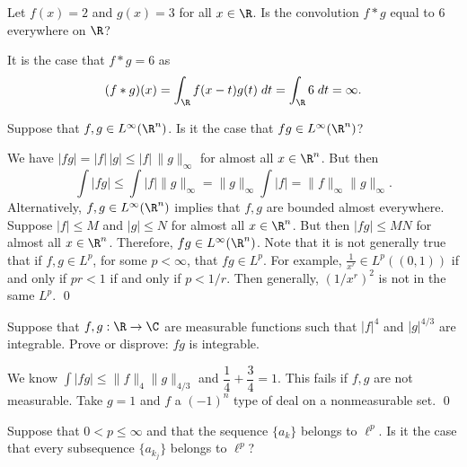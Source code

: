 \begin{quizsol}
Let $f(x)=2$ and $g(x)=3$ for all $x \in \R$. Is the convolution $f*g$ equal to 6 everywhere on $\R$?
\end{quizsol}

\pf It is the case that $f*g=6$ as
	\[
	(f*g)(x)= \int_\R f(x-t)g(t) \; dt= \int_\R 6 \; dt = \infty.
	\]


\begin{quizsol}
Suppose that $f,g \in L^\infty(\R^n)$. Is it the case that $fg \in L^\infty(\R^n)$? 
\end{quizsol}

\pf We have $|fg|=|f|\,|g| \leq |f| \, \|g\|_\infty$ for almost all $x \in \R^n$. But then
	\[
	\int |fg| \leq \int |f| \|g\|_\infty = \|g\|_\infty \int |f|= \|f\|_\infty \|g\|_\infty. 
	\]
Alternatively, $f,g \in L^\infty(\R^n)$ implies that $f,g$ are bounded almost everywhere. Suppose $|f| \leq M$ and $|g| \leq N$ for almost all $x \in \R^n$. But then $|fg| \leq MN$ for almost all $x \in \R^n$. Therefore, $fg \in L^\infty(\R^n)$. Note that it is not generally true that if $f,g \in L^p$, for some $p<\infty$, that $fg \in L^p$. For example, $\frac{1}{x^r} \in L^p((0,1))$ if and only if $pr<1$ if and only if $p<1/r$. Then generally, $(1/x^r)^2$ is not in the same $L^p$. \qed \\


%


\begin{quizsol}
Suppose that $f,g: \R \to \C$ are measurable functions such that $|f|^4$ and $|g|^{4/3}$ are integrable. Prove or disprove: $fg$ is integrable.
\end{quizsol}

\pf We know $\int |fg| \leq \|f\|_4 \|g\|_{4/3}$ and $\dfrac{1}{4} + \dfrac{3}{4} = 1$. This fails if $f,g$ are not measurable. Take $g=1$ and $f$ a $(-1)^n$ type of deal on a nonmeasurable set. \qed \\


\begin{quizsol}
Suppose that $0< p \leq \infty$ and that the sequence $\{a_k\}$ belongs to $\ell^p$. Is it the case that every subsequence $\{a_{k_j}\}$ belongs to $\ell^p$?
\end{quizsol}


